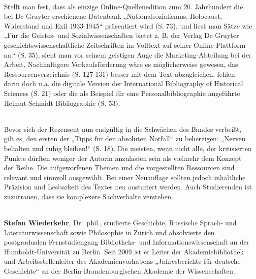 \documentclass[a4paper,
fontsize=11pt,
oneside,
numbers=noperiodatend,
parskip=half-,
bibliography=totoc,
final
]{scrartcl}
\begin{document}
\\ Stellt man fest, dass als einzige Online-Quellenedition zum 20.
Jahrhundert die bei De Gruyter erschienene Datenbank
„Nationalsozialismus, Holocaust, Widerstand und Exil 1933-1945``
präsentiert wird (S. 73), und liest man Sätze wie „Für die Geistes- und
Sozialwissenschaften bietet z. B. der Verlag De Gruyter
geschichtswissenschaftliche Zeitschriften im Volltext auf seiner
Online-Plattform an.`` (S. 35), sieht man vor seinem geistigen Auge die
Marketing-Abteilung bei der Arbeit. Nachhaltigere Verkaufsförderung wäre
es möglicherweise gewesen, das Ressourcenverzeichnis (S. 127-131) besser
mit dem Text abzugleichen, fehlen darin doch u.a. die digitale Version
der International Bibliography of Historical Sciences (S. 21) oder die
als Beispiel für eine Personalbibliographie angeführte Helmut Schmidt
Bibliographie (S. 53).

\\ Bevor sich der Rezensent nun endgültig in die Schwächen des Bandes
verbeißt, gilt es, den ersten der „Tipps für den absoluten Notfall`` zu
beherzigen: „Nerven behalten und ruhig bleiben!`` (S. 18). Die meisten,
wenn nicht alle, der kritisierten Punkte dürften weniger der Autorin
anzulasten sein als vielmehr dem Konzept der Reihe. Die aufgeworfenen
Themen und die vorgestellten Ressourcen sind relevant und sinnvoll
ausgewählt. Bei einer Neuauflage sollten jedoch inhaltliche Präzision
und Lesbarkeit des Textes neu austariert werden. Auch Studierenden ist
zuzutrauen, dass sie komplexere Sachverhalte verstehen.

\\ \textbf{Stefan Wiederkehr}, Dr.~phil., studierte Geschichte,
Russische Sprach- und Literaturwissenschaft sowie Philosophie in Zürich
und absolvierte den postgradualen Fernstudiengang Bibliotheks- und
Informationswissenschaft an der Humboldt-Universität zu Berlin. Seit
2009 ist er Leiter der Akademiebibliothek und Arbeitsstellenleiter des
Akademienvorhabens „Jahresberichte für deutsche Geschichte`` an der
Berlin-Brandenburgischen Akademie der Wissenschaften.
\end{document}
